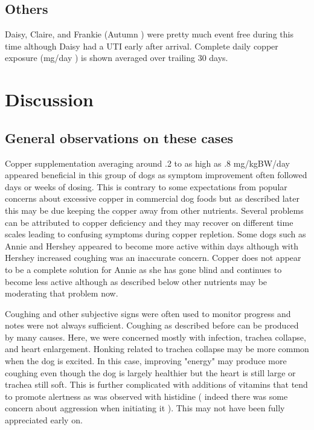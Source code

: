 \subsection{ Others }

Daisy, Claire, and Frankie (Autumn ) were pretty much event
free during this time although Daisy had a UTI early after arrival. 
Complete daily copper exposure (mg/day ) is shown averaged over 
trailing 30 days. 

\mjmotherscu

\section{Discussion }

\subsection{ General observations on these cases }


Copper supplementation averaging around .2 to as high 
as .8 mg/kgBW/day appeared beneficial in this group of
dogs as symptom improvement often followed days or weeks of dosing.
This is contrary to some expectations  from popular concerns
about excessive copper in commercial dog foods  but as described
later this may be due keeping the copper away from other nutrients.
Several problems can be attributed to copper deficiency and 
they may recover on different time scales leading to confusing
symptoms during copper repletion. Some dogs such as Annie and
Hershey appeared to become more active within days although
with Hershey increased coughing was an inaccurate concern.
Copper does not appear to be a complete solution for Annie
as she has gone blind and continues to become less active although
as described below other nutrients may be moderating that problem now.




Coughing and other subjective signs were often used
to monitor progress and notes were not always sufficient.
Coughing as described before can be produced by many
causes. Here, we were concerned mostly with infection,
trachea collapse, and heart enlargement. Honking
related to trachea collapse may be more common when the
dog is excited. In this case, improving "energy" may
produce more coughing even though the dog is largely
healthier but the heart is still large or trachea
still soft. This is further complicated with additions
of vitamins that tend to promote alertness as was 
observed with histidine ( indeed there was some concern
about aggression when initiating it ). This may not
have been fully appreciated early on.  

